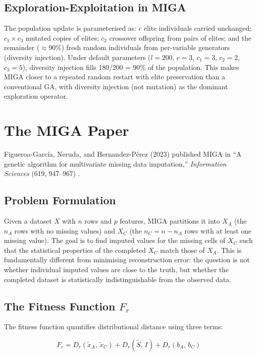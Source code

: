 \subsection{Exploration-Exploitation in MIGA}

The population update is parameterised as: $c$ elite individuals carried unchanged; $c_1 \times c_3$ mutated copies of elites; $c_2$ crossover offspring from pairs of elites; and the remainder ($\approx$90\%) fresh random individuals from per-variable generators (diversity injection). Under default parameters ($l=200$, $c=3$, $c_1=3$, $c_2=2$, $c_3=5$), diversity injection fills 180/200 = 90\% of the population. This makes MIGA closer to a repeated random restart with elite preservation than a conventional GA, with diversity injection (not mutation) as the dominant exploration operator.

\section{The MIGA Paper}

Figueroa-Garc\'ia, Neruda, and Hernandez-P\'erez (2023) published MIGA in ``A genetic algorithm for multivariate missing data imputation,'' \textit{Information Sciences} (619, 947--967) \cite{FigueroaGarcia2023}.

\subsection{Problem Formulation}

Given a dataset $X$ with $n$ rows and $p$ features, MIGA partitions it into $X_A$ (the $n_A$ rows with no missing values) and $X_C$ (the $n_C = n - n_A$ rows with at least one missing value). The goal is to find imputed values for the missing cells of $X_C$ such that the statistical properties of the completed $X_C$ match those of $X_A$. This is fundamentally different from minimising reconstruction error: the question is not whether individual imputed values are close to the truth, but whether the completed dataset is statistically indistinguishable from the observed data.

\subsection{The Fitness Function $F_r$}

The fitness function quantifies distributional distance using three terms:

\begin{equation}
    F_r = D_r(\tilde{x}_A,\, \tilde{x}_C) + D_r(\tilde{S},\, I) + D_r(b_A,\, b_C)
    \label{eq:fr_full}
\end{equation}

